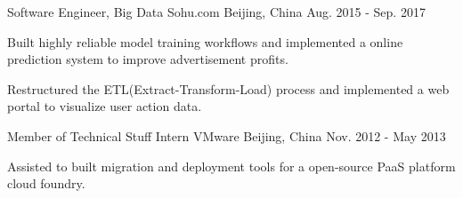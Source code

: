 \begin{cventries}
  \cventry
    {Software Engineer, Big Data} %
    {Sohu.com} %
    {Beijing, China} %
    {Aug. 2015 - Sep. 2017} %
    {
        \begin{cvitems}
          \item{Built highly reliable model training workflows and implemented a online prediction system to improve advertisement profits.}
          \item{Restructured the ETL(Extract-Transform-Load) process and implemented a web portal to visualize user action data.}
        \end{cvitems}
    }
    
  \cventry
    {Member of Technical Stuff Intern} %
    {VMware} %
    {Beijing, China} %
    {Nov. 2012 - May 2013} %
    {
      \begin{cvitems}
        \item{Assisted to built migration and deployment tools for a open-source PaaS platform cloud foundry.}
      \end{cvitems}
    }

\end{cventries}
